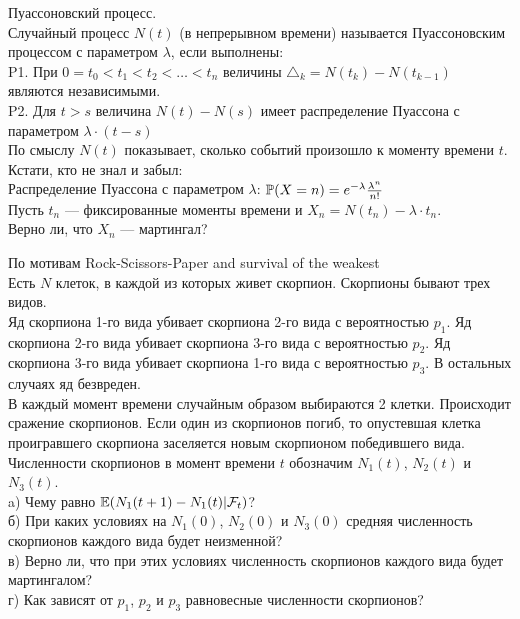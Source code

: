 \begin{solution}
\begin{solution}
\begin{solution}
\begin{solution}
\begin{solution}
\begin{solution}
\begin{solution}
\begin{solution}
\begin{solution}
{\begin{solution}
\end{solution}

\begin{problem}
 Пуассоновский процесс. \\
Случайный процесс $N(t)$ (в непрерывном времени) называется
Пуассоновским
процессом с параметром $\lambda$, если выполнены: \\
P1. При $0=t_{0}<t_{1}<t_{2}<\ldots<t_{n}$ величины
$\triangle_{k}=N(t_{k})-N(t_{k-1})$ являются независимыми. \\
P2. Для $t>s$ величина $N(t)-N(s)$ имеет распределение Пуассона с
параметром $\lambda \cdot (t-s)$ \\
По смыслу $N(t)$ показывает, сколько событий произошло к моменту
времени $t$. \\
Кстати, кто не знал и забыл: \\
Распределение Пуассона с параметром $\lambda$:
$\P(X=n)=e^{-\lambda}\frac{\lambda^{n}}{n!}$ \\
Пусть $t_{n}$ --- фиксированные моменты времени и
$X_{n}=N(t_{n})-\lambda\cdot t_{n}$. \\
Верно ли, что $X_{n}$ --- мартингал? 
\end{problem} 
\begin{solution} 

\end{solution}

\begin{problem}
По мотивам Rock-Scissors-Paper and survival of the weakest \\
Есть $N$ клеток, в каждой из которых живет скорпион. Скорпионы
бывают трех видов. \\
Яд скорпиона 1-го вида убивает скорпиона 2-го вида с вероятностью
$p_{1}$. Яд скорпиона 2-го вида убивает скорпиона 3-го вида с
вероятностью $p_{2}$. Яд скорпиона 3-го вида убивает скорпиона
1-го вида с вероятностью $p_{3}$. В остальных случаях яд
безвреден. \\
В каждый момент времени случайным образом выбираются 2 клетки.
Происходит сражение скорпионов. Если один из скорпионов погиб, то
опустевшая клетка проигравшего скорпиона заселяется новым
скорпионом победившего вида. \\
Численности скорпионов в момент времени $t$ обозначим $N_{1}(t)$,
$N_{2}(t)$ и $N_{3}(t)$. \\
a) Чему равно $\E(N_{1}(t+1)-N_{1}(t)|\mathcal{F}_{t})$? \\
б) При каких условиях на $N_{1}(0)$, $N_{2}(0)$ и $N_{3}(0)$
средняя численность скорпионов каждого вида будет неизменной? \\
в) Верно ли, что при этих условиях численность скорпионов каждого
вида будет мартингалом? \\
г) Как зависят от $p_{1}$, $p_{2}$ и $p_{3}$ равновесные
численности скорпионов? 
\end{problem} 
\begin{solution} 


\end{solution}}
\end{solution}
\end{solution}
\end{solution}
\end{solution}
\end{solution}
\end{solution}
\end{solution}
\end{solution}
\end{solution}
